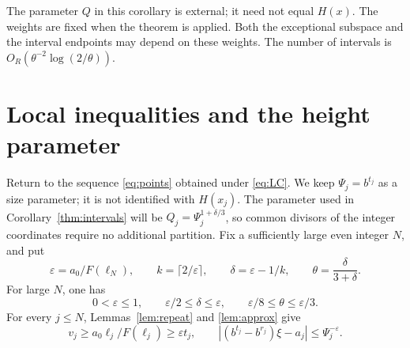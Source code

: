 \documentclass[11pt]{article}
\numberwithin{equation}{section}
\theoremstyle{remark}
\newcommand{\eps}{\varepsilon}
\begin{document}
The parameter $Q$ in this corollary is external; it need not equal
$H(x)$. The weights are fixed when the theorem is applied.
Both the exceptional subspace and the interval endpoints may depend
on these weights. The number of intervals is
$O_R(\theta^{-2}\log(2/\theta))$.

\section{Local inequalities and the height parameter}\label{sec:conversion}

Return to the sequence \eqref{eq:points} obtained under \eqref{eq:LC}.
We keep $\Psi_j=b^{t_j}$ as a size parameter; it is not identified
with $H(x_j)$. The parameter used in Corollary~\ref{thm:intervals}
will be $Q_j=\Psi_j^{1+\delta/3}$, so common divisors of the integer
coordinates require no additional partition.
Fix a sufficiently large even integer $N$, and put
\begin{equation}\label{eq:eps}
 \eps=a_0/F(\ell_N),\qquad
 k=\lceil2/\eps\rceil,\qquad
 \delta=\eps-1/k,\qquad
 \theta=\frac{\delta}{3+\delta}.
\end{equation}
For large $N$, one has
\begin{equation}\label{eq:exponentbounds}
 0<\eps\le1,\qquad \eps/2\le\delta\le\eps,\qquad
 \eps/8\le\theta\le\eps/3.
\end{equation}
For every $j\le N$, Lemmas~\ref{lem:repeat} and \ref{lem:approx} give
\begin{equation}\label{eq:epsilonapprox}
 v_j\ge a_0\ell_j/F(\ell_j)\ge\eps t_j,\qquad
 |(b^{t_j}-b^{r_j})\xi-a_j|\le\Psi_j^{-\eps}.
\end{equation}
\end{document}
